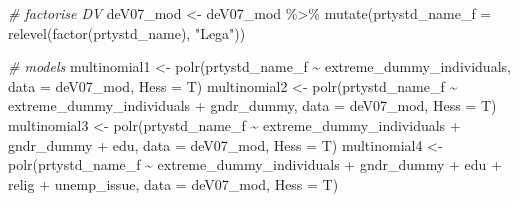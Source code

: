 \documentclass[
]{article}
\newenvironment{Shaded}{\begin{snugshade}}{\end{snugshade}}
\newcommand{\AttributeTok}[1]{\textcolor[rgb]{0.77,0.63,0.00}{#1}}
\newcommand{\CommentTok}[1]{\textcolor[rgb]{0.56,0.35,0.01}{\textit{#1}}}
\newcommand{\FunctionTok}[1]{\textcolor[rgb]{0.00,0.00,0.00}{#1}}
\newcommand{\NormalTok}[1]{#1}
\newcommand{\OtherTok}[1]{\textcolor[rgb]{0.56,0.35,0.01}{#1}}
\newcommand{\SpecialCharTok}[1]{\textcolor[rgb]{0.00,0.00,0.00}{#1}}
\newcommand{\StringTok}[1]{\textcolor[rgb]{0.31,0.60,0.02}{#1}}
\begin{document}
\begin{Shaded}
\begin{Highlighting}[]
\CommentTok{\# factorise DV}
\NormalTok{deV07\_mod }\OtherTok{\textless{}{-}}\NormalTok{ deV07\_mod }\SpecialCharTok{\%\textgreater{}\%}
  \FunctionTok{mutate}\NormalTok{(}\AttributeTok{prtystd\_name\_f =} \FunctionTok{relevel}\NormalTok{(}\FunctionTok{factor}\NormalTok{(prtystd\_name), }\StringTok{"Lega"}\NormalTok{))}

\CommentTok{\# models}
\NormalTok{multinomial1 }\OtherTok{\textless{}{-}} \FunctionTok{polr}\NormalTok{(prtystd\_name\_f }\SpecialCharTok{\textasciitilde{}}\NormalTok{ extreme\_dummy\_individuals, }
                     \AttributeTok{data =}\NormalTok{ deV07\_mod, }
                     \AttributeTok{Hess =}\NormalTok{ T)}
\NormalTok{multinomial2 }\OtherTok{\textless{}{-}} \FunctionTok{polr}\NormalTok{(prtystd\_name\_f }\SpecialCharTok{\textasciitilde{}}\NormalTok{ extreme\_dummy\_individuals }\SpecialCharTok{+}\NormalTok{ gndr\_dummy, }
                     \AttributeTok{data =}\NormalTok{ deV07\_mod, }
                     \AttributeTok{Hess =}\NormalTok{ T)}
\NormalTok{multinomial3 }\OtherTok{\textless{}{-}} \FunctionTok{polr}\NormalTok{(prtystd\_name\_f }\SpecialCharTok{\textasciitilde{}}\NormalTok{ extreme\_dummy\_individuals }\SpecialCharTok{+}\NormalTok{ gndr\_dummy }\SpecialCharTok{+}\NormalTok{ edu, }
                     \AttributeTok{data =}\NormalTok{ deV07\_mod, }
                     \AttributeTok{Hess =}\NormalTok{ T)}
\NormalTok{multinomial4 }\OtherTok{\textless{}{-}} \FunctionTok{polr}\NormalTok{(prtystd\_name\_f }\SpecialCharTok{\textasciitilde{}}\NormalTok{ extreme\_dummy\_individuals }\SpecialCharTok{+}\NormalTok{ gndr\_dummy }\SpecialCharTok{+}\NormalTok{ edu }\SpecialCharTok{+}\NormalTok{ relig }\SpecialCharTok{+}\NormalTok{ unemp\_issue, }
                     \AttributeTok{data =}\NormalTok{ deV07\_mod, }
                     \AttributeTok{Hess =}\NormalTok{ T)}


\end{Highlighting}
\end{Shaded}
\end{document}
